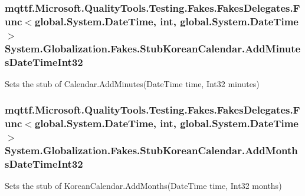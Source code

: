 \hypertarget{class_system_1_1_globalization_1_1_fakes_1_1_stub_korean_calendar_ade73c0c51374df91e7d052f2c1735f65}{
\subsubsection[{Add\-Minutes\-Date\-Time\-Int32}]{\setlength{\rightskip}{0pt plus 5cm}mqttf.\-Microsoft.\-Quality\-Tools.\-Testing.\-Fakes.\-Fakes\-Delegates.\-Func$<$global.\-System.\-Date\-Time, int, global.\-System.\-Date\-Time$>$ System.\-Globalization.\-Fakes.\-Stub\-Korean\-Calendar.\-Add\-Minutes\-Date\-Time\-Int32}}\label{class_system_1_1_globalization_1_1_fakes_1_1_stub_korean_calendar_ade73c0c51374df91e7d052f2c1735f65}


Sets the stub of Calendar.\-Add\-Minutes(\-Date\-Time time, Int32 minutes)

\hypertarget{class_system_1_1_globalization_1_1_fakes_1_1_stub_korean_calendar_a7e43f274fc6e08346ea90f929a0ae5c6}{
\subsubsection[{Add\-Months\-Date\-Time\-Int32}]{\setlength{\rightskip}{0pt plus 5cm}mqttf.\-Microsoft.\-Quality\-Tools.\-Testing.\-Fakes.\-Fakes\-Delegates.\-Func$<$global.\-System.\-Date\-Time, int, global.\-System.\-Date\-Time$>$ System.\-Globalization.\-Fakes.\-Stub\-Korean\-Calendar.\-Add\-Months\-Date\-Time\-Int32}}\label{class_system_1_1_globalization_1_1_fakes_1_1_stub_korean_calendar_a7e43f274fc6e08346ea90f929a0ae5c6}


Sets the stub of Korean\-Calendar.\-Add\-Months(\-Date\-Time time, Int32 months)

